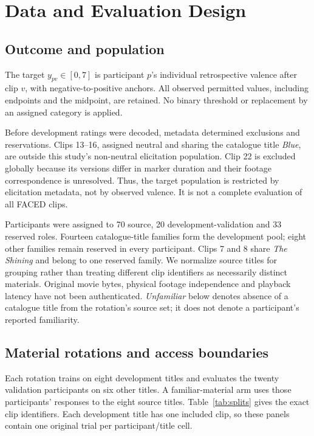 \documentclass[conference]{IEEEtran}
\begin{document}
\section{Data and Evaluation Design}
\subsection{Outcome and population}
The target \(y_{pv}\in[0,7]\) is participant \(p\)'s individual retrospective valence after clip \(v\), with negative-to-positive anchors. All observed permitted values, including endpoints and the midpoint, are retained. No binary threshold or replacement by an assigned category is applied.

Before development ratings were decoded, metadata determined exclusions and reservations. Clips 13--16, assigned neutral and sharing the catalogue title \emph{Blue}, are outside this study's non-neutral elicitation population. Clip 22 is excluded globally because its versions differ in marker duration and their footage correspondence is unresolved. Thus, the target population is restricted by elicitation metadata, not by observed valence. It is not a complete evaluation of all FACED clips.

Participants were assigned to 70 source, 20 development-validation and 33 reserved roles. Fourteen catalogue-title families form the development pool; eight other families remain reserved in every participant. Clips 7 and 8 share \emph{The Shining} and belong to one reserved family. We normalize source titles for grouping rather than treating different clip identifiers as necessarily distinct materials. Original movie bytes, physical footage independence and playback latency have not been authenticated. \emph{Unfamiliar} below denotes absence of a catalogue title from the rotation's source set; it does not denote a participant's reported familiarity.

\subsection{Material rotations and access boundaries}
Each rotation trains on eight development titles and evaluates the twenty validation participants on six other titles. A familiar-material arm uses those participants' responses to the eight source titles. Table~\ref{tab:splits} gives the exact clip identifiers. Each development title has one included clip, so these panels contain one original trial per participant/title cell.
\end{document}
